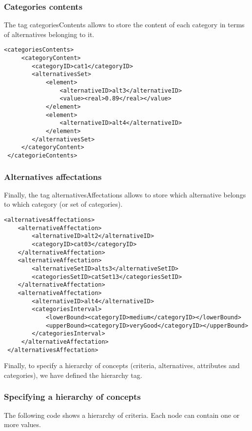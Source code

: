 \documentclass[a4paper,oneside,10 pt]{article}
\newcommand{\code}{\asciifamily}
\begin{document}
\subsubsection{Categories contents}

The tag {\code categoriesContents} allows to store the content of each category in terms of alternatives belonging to it. 
{\code
\begin{lstlisting}[style=prototype]
 <categoriesContents>
	 <categoryContent>
		<categoryID>cat1</categoryID>
		<alternativesSet>
			<element>
				<alternativeID>alt3</alternativeID>
				<value><real>0.89</real></value>
			</element>
			<element>
				<alternativeID>alt4</alternativeID>
			</element>
		</alternativesSet>
	 </categoryContent>
 </categorieContents>
\end{lstlisting}
}

\subsubsection{Alternatives affectations}

Finally, the tag {\code alternativesAffectations} allows to store which alternative belongs to which category (or set of categories). 
{\code
\begin{lstlisting}[style=prototype]
 <alternativesAffectations>
	<alternativeAffectation>
		<alternativeID>alt2</alternativeID>
		<categoryID>cat03</categoryID>
	</alternativeAffectation>
	<alternativeAffectation>
		<alternativeSetID>alts3</alternativeSetID>
		<categoriesSetID>catSet13</categoriesSetID>
	</alternativeAffectation>
	<alternativeAffectation>
		<alternativeID>alt4</alternativeID>
		<categoriesInterval>
			<lowerBound><categoryID>medium</categoryID></lowerBound>
			<upperBound><categoryID>veryGood</categoryID></upperBound>
		</categoriesInterval>
	 </alternativeAffectation>
 </alternativesAffectation>
\end{lstlisting}
}

Finally, to specify a hierarchy of concepts (criteria, alternatives, attributes and categories), we have defined the {\code hierarchy} tag.


\subsubsection{Specifying a hierarchy of concepts}

The following code shows a hierarchy of criteria. Each node can contain one or more values. 
\end{document}
